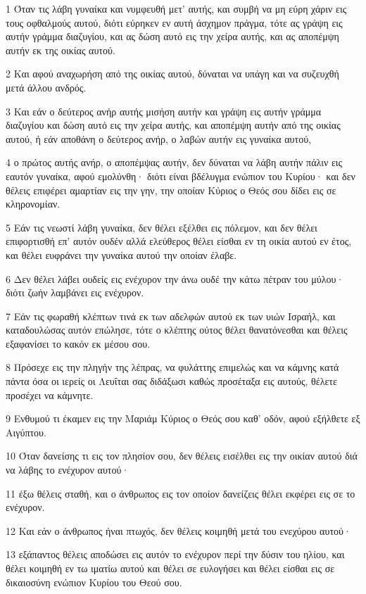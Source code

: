 \par 1 Όταν τις λάβη γυναίκα και νυμφευθή μετ' αυτής, και συμβή να μη εύρη χάριν εις τους οφθαλμούς αυτού, διότι εύρηκεν εν αυτή άσχημον πράγμα, τότε ας γράψη εις αυτήν γράμμα διαζυγίου, και ας δώση αυτό εις την χείρα αυτής, και ας αποπέμψη αυτήν εκ της οικίας αυτού.
\par 2 Και αφού αναχωρήση από της οικίας αυτού, δύναται να υπάγη και να συζευχθή μετά άλλου ανδρός.
\par 3 Και εάν ο δεύτερος ανήρ αυτής μισήση αυτήν και γράψη εις αυτήν γράμμα διαζυγίου και δώση αυτό εις την χείρα αυτής, και αποπέμψη αυτήν από της οικίας αυτού, ή εάν αποθάνη ο δεύτερος ανήρ, ο λαβών αυτήν εις γυναίκα αυτού,
\par 4 ο πρώτος αυτής ανήρ, ο αποπέμψας αυτήν, δεν δύναται να λάβη αυτήν πάλιν εις εαυτόν γυναίκα, αφού εμολύνθη· διότι είναι βδέλυγμα ενώπιον του Κυρίου· και δεν θέλεις επιφέρει αμαρτίαν εις την γην, την οποίαν Κύριος ο Θεός σου δίδει εις σε κληρονομίαν.
\par 5 Εάν τις νεωστί λάβη γυναίκα, δεν θέλει εξέλθει εις πόλεμον, και δεν θέλει επιφορτισθή επ' αυτόν ουδέν αλλά ελεύθερος θέλει είσθαι εν τη οικία αυτού εν έτος, και θέλει ευφράνει την γυναίκα αυτού την οποίαν έλαβε.
\par 6 Δεν θέλει λάβει ουδείς εις ενέχυρον την άνω ουδέ την κάτω πέτραν του μύλου· διότι ζωήν λαμβάνει εις ενέχυρον.
\par 7 Εάν τις φωραθή κλέπτων τινά εκ των αδελφών αυτού εκ των υιών Ισραήλ, και καταδουλώσας αυτόν επώλησε, τότε ο κλέπτης ούτος θέλει θανατόνεσθαι και θέλεις εξαφανίσει το κακόν εκ μέσου σου.
\par 8 Πρόσεχε εις την πληγήν της λέπρας, να φυλάττης επιμελώς και να κάμνης κατά πάντα όσα οι ιερείς οι Λευΐται σας διδάξωσι καθώς προσέταξα εις αυτούς, θέλετε προσέχει να κάμνητε.
\par 9 Ενθυμού τι έκαμεν εις την Μαριάμ Κύριος ο Θεός σου καθ' οδόν, αφού εξήλθετε εξ Αιγύπτου.
\par 10 Όταν δανείσης τι εις τον πλησίον σου, δεν θέλεις εισέλθει εις την οικίαν αυτού διά να λάβης το ενέχυρον αυτού·
\par 11 έξω θέλεις σταθή, και ο άνθρωπος εις τον οποίον δανείζεις θέλει εκφέρει εις σε το ενέχυρον.
\par 12 Και εάν ο άνθρωπος ήναι πτωχός, δεν θέλεις κοιμηθή μετά του ενεχύρου αυτού·
\par 13 εξάπαντος θέλεις αποδώσει εις αυτόν το ενέχυρον περί την δύσιν του ηλίου, και θέλει κοιμηθή εν τω ιματίω αυτού και θέλει σε ευλογήσει και θέλει είσθαι εις σε δικαιοσύνη ενώπιον Κυρίου του Θεού σου.
